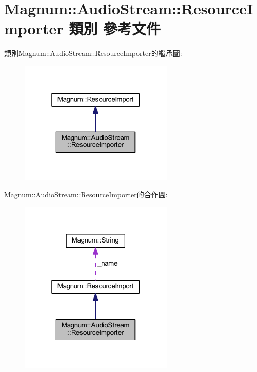 \hypertarget{class_magnum_1_1_audio_stream_1_1_resource_importer}{}\section{Magnum\+:\+:Audio\+Stream\+:\+:Resource\+Importer 類別 參考文件}
\label{class_magnum_1_1_audio_stream_1_1_resource_importer}


類別\+Magnum\+:\+:Audio\+Stream\+:\+:Resource\+Importer的繼承圖\+:\nopagebreak
\begin{figure}[H]
\begin{center}
\leavevmode
\includegraphics[width=208pt]{class_magnum_1_1_audio_stream_1_1_resource_importer__inherit__graph}
\end{center}
\end{figure}


Magnum\+:\+:Audio\+Stream\+:\+:Resource\+Importer的合作圖\+:\nopagebreak
\begin{figure}[H]
\begin{center}
\leavevmode
\includegraphics[width=208pt]{class_magnum_1_1_audio_stream_1_1_resource_importer__coll__graph}
\end{center}
\end{figure}
